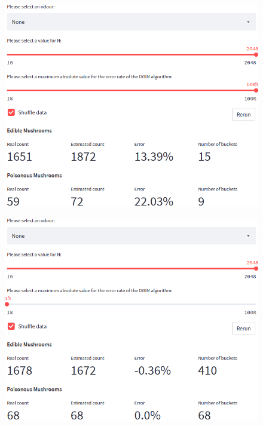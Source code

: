 \begin{frame}[plain]{}
	\begin{figure}
		\includegraphics[height=.75\linewidth]{images/big_e.png}
	\end{figure}
\end{frame}

\begin{frame}[plain]{}
	\begin{figure}
		\includegraphics[height=.75\linewidth]{images/small_e.png}
	\end{figure}
\end{frame}